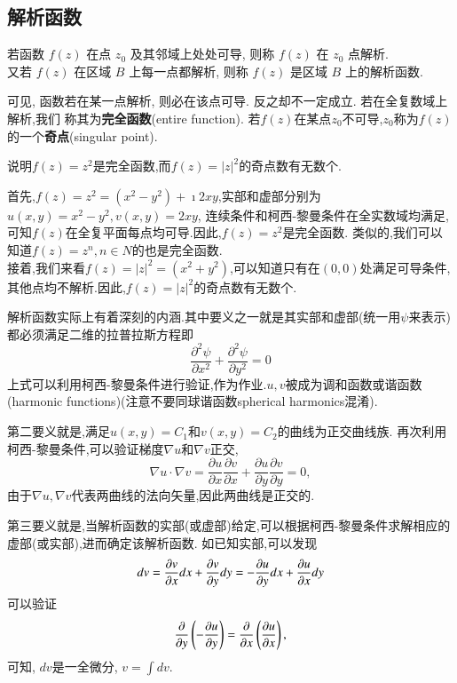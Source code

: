 \subsection{解析函数}
\begin{definition}
若函数 $f(z)$ 在点 $z_0$ 及其邻域上处处可导, 则称 $f(z)$ 在 $z_0$ 点解析.\\
 又若 $f(z)$ 在区域 $B$ 上每一点都解析, 则称 $f(z)$ 是区域 $B$ 上的解析函数.
\end{definition} 
 可见, 函数若在某一点解析, 则必在该点可导. 反之却不一定成立. 若在全复数域上解析,我们
 称其为{\bf 完全函数}(entire function).
 若$f(z)$在某点$z_0$不可导,$z_0$称为$f(z)$的一个{\bf 奇点}(singular point).

 \begin{example}
说明$f(z)=z^2$是完全函数,而$f(z)=|z|^2$的奇点数有无数个.
\end{example}
\begin{solution}
    首先,$f(z) =z^2 = (x^2 - y ^2) + \imath 2 x y$,实部和虚部分别为$u(x,y) = x^2 - y^2, v(x,y)=2x y$,
连续条件和柯西-黎曼条件在全实数域均满足,可知$f(z)$在全复平面每点均可导.因此,$f(z)=z^2$是完全函数.
类似的,我们可以知道$f(z)=z^n, n\in N$的也是完全函数.\\
    接着,我们来看$f(z) = |z|^2 = (x^2 + y ^2)$,可以知道只有在$(0,0)$处满足可导条件,其他点均不解析.因此,$f(z)=|z|^2$的奇点数有无数个.
 \end{solution}

 解析函数实际上有着深刻的内涵.其中要义之一就是其实部和虚部(统一用$\psi$来表示)都必须满足二维的拉普拉斯方程即
 \begin{equation}
    \label{eq:Laplace_eq}
    \frac{\partial^2 \psi}{\partial x^2}+\frac{\partial^2 \psi}{\partial y^2}=0
 \end{equation}
上式可以利用柯西-黎曼条件进行验证,作为作业.$u,v$被成为调和函数或谐函数(harmonic functions)(注意不要同球谐函数spherical harmonics混淆).

第二要义就是,满足$u(x,y) = C_1$和$v(x,y)= C_2$的曲线为正交曲线族.
再次利用柯西-黎曼条件,可以验证梯度$\nabla u $和$\nabla v$正交,
\begin{equation}
    \nabla u \cdot \nabla v = \frac{\partial u}{\partial x} 
    \frac{\partial v}{\partial x}+\frac{\partial u}{\partial y} \frac{\partial v}{\partial y}=0 ,
\end{equation}
由于$\nabla u, \nabla v$代表两曲线的法向矢量,因此两曲线是正交的.

第三要义就是,当解析函数的实部(或虚部)给定,可以根据柯西-黎曼条件求解相应的虚部(或实部),进而确定该解析函数.
如已知实部,可以发现
\begin{equation}
    d v = \frac{\partial{v}}{\partial{x}} dx + \frac{\partial{v}}{\partial{y}} dy = -\frac{\partial{u}}{\partial{y}} dx + \frac{\partial{u}}{\partial{x}} dy
\end{equation}
可以验证 
$$
\frac{\partial{}}{\partial{y}} \left( - \frac{\partial{u}}{\partial{y}} \right) = \frac{\partial{}}{\partial{x}} \left( \frac{\partial{u}}{\partial{x}} \right) , 
$$
可知, $dv$是一全微分, $v = \int dv$.

